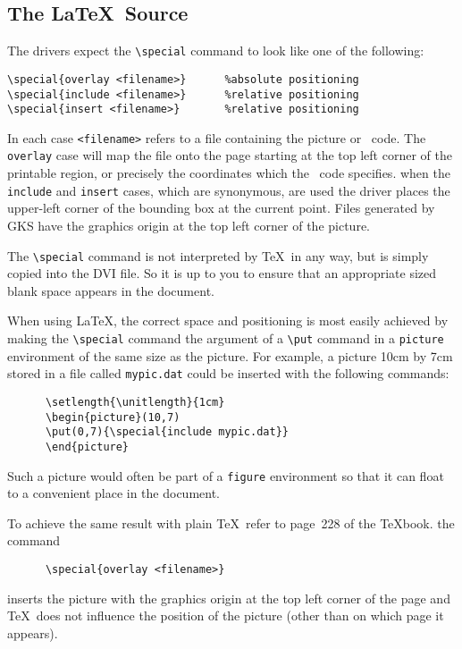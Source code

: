 \subsection{The \LaTeX\ Source}

The drivers expect the \hbox{\verb|\special|} command to look like one of the
following: 
\begin{verbatim} 
\special{overlay <filename>}      %absolute positioning 
\special{include <filename>}      %relative positioning
\special{insert <filename>}       %relative positioning 
\end{verbatim} 
In each case \hbox{\verb|<filename>|} refers to a file containing the picture
or \PS\ code. The {\tt overlay} case will map the file onto the page starting
at the top left corner of the printable region, or precisely the coordinates
which the \PS\ code specifies. when the {\tt include} and {\tt insert} cases,
which are synonymous, are used the driver places the upper-left corner of the
bounding box at the current point. Files generated by GKS have the graphics
origin at the top left corner of the picture.

The {\tt\verb+\special+} command is not interpreted by \TeX\ in any way, but
is simply copied into the DVI file. So it is up to
you to ensure that an appropriate sized blank space appears in the document. 

When using \LaTeX, the correct space and positioning is most easily achieved
by making the {\tt\verb+\special+} command the argument of a {\tt\verb+\put+} 
command in a {\tt picture} environment of the same size as the picture. For
example, a picture 10cm by 7cm stored in a file called {\tt mypic.dat} could
be inserted with the following commands:
\begin{verbatim}
      \setlength{\unitlength}{1cm}
      \begin{picture}(10,7)
      \put(0,7){\special{include mypic.dat}}
      \end{picture}
\end{verbatim} 

Such a picture would often be part of a {\tt figure} environment so that
it can float to a convenient place in the document.

To achieve the same result with plain \TeX\, refer to page~228 of the
{\TeX}book. the command
           
\begin{verbatim}
      \special{overlay <filename>}
\end{verbatim}
inserts the picture with the graphics origin at the top left corner of the
page and \TeX\ does not influence the position of the picture (other than
on which page it appears).


